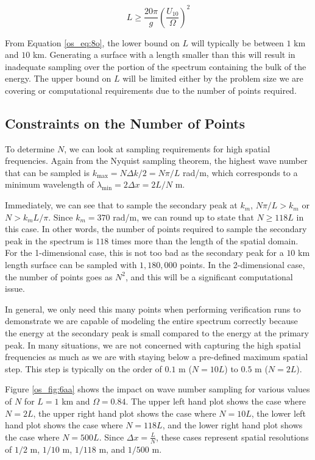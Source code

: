 \begin{equation}
\label{os_eq:8o}
\boxed{L \geq \frac{20\pi}{g}\left(\frac{U_{10}}{\Omega} \right)^2}
\end{equation}
\renewcommand{\baselinestretch}{2} \small\normalsize

From Equation \ref{os_eq:8o}, the lower bound on $L$ will typically be between $1$ km and $10$ km. Generating a surface with a length smaller than this will result in inadequate sampling over the portion of the spectrum containing the bulk of the energy. The upper bound on $L$ will be limited either by the problem size we are covering or computational requirements due to the number of points required.

\subsection {Constraints on the Number of Points}
To determine $N$, we can look at sampling requirements for high spatial frequencies. Again from the Nyquist sampling theorem, the highest wave number that can be sampled is $k_{\text{max}} = N\Delta k/2 = N\pi/L$ rad/m, which corresponds to a minimum wavelength of $\lambda_{\text{min}} = 2\Delta x = 2L/N$ m.

Immediately, we can see that to sample the secondary peak at $k_m$, $N\pi/L > k_m$ or $N > k_mL/\pi$. Since $k_m = 370$ rad/m, we can round up to state that $N \geq 118L$ in this case. In other words, the number of points required to sample the secondary peak in the spectrum is $118$ times more than the length of the spatial domain. For the 1-dimensional case, this is not too bad as the secondary peak for a $10$ km length surface can be sampled with $1,180,000$ points. In the 2-dimensional case, the number of points goes as $N^2$, and this will be a significant computational issue.

In general, we only need this many points when performing verification runs to demonstrate we are capable of modeling the entire spectrum correctly because the energy at the secondary peak is small compared to the energy at the primary peak. In many situations, we are not concerned with capturing the high spatial frequencies as much as we are with staying below a pre-defined maximum spatial step. This step is typically on the order of $0.1$ m ($N = 10L$) to $0.5$ m ($N = 2L$).

Figure \ref{os_fig:6aa} shows the impact on wave number sampling for various values of $N$ for $L = 1$ km and $\Omega = 0.84$. The upper left hand plot shows the case where $N = 2L$, the upper right hand plot shows the case where $N = 10L$, the lower left hand plot shows the case where $N = 118L$, and the lower right hand plot shows the case where $N = 500L$. Since $\Delta x = \frac{L}{N}$, these cases represent spatial resolutions of $1/2$ m, $1/10$ m, $1/118$ m, and $1/500$ m. 

